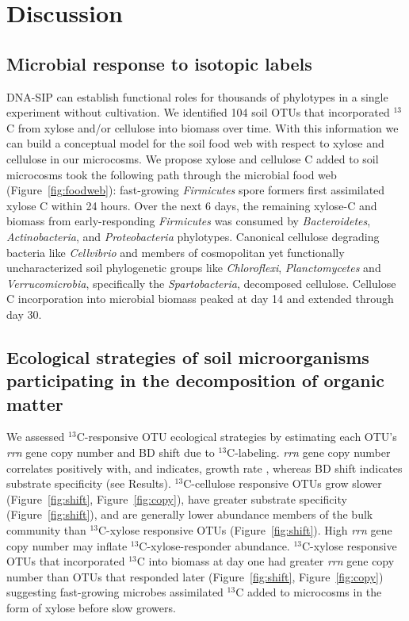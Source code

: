 \section{Discussion} 
\subsection{Microbial response to isotopic labels}
DNA-SIP can establish functional roles for thousands of phylotypes in a single
experiment without cultivation. We identified 104 soil OTUs that incorporated
$^{13}$C from xylose and/or cellulose into biomass over time. With this
information we can build a conceptual model for the soil food web with respect
to xylose and cellulose in our microcosms. We propose xylose and
cellulose C added to soil microcosms took the following path through the
microbial food web (Figure~\ref{fig:foodweb}): fast-growing \textit{Firmicutes}
spore formers first assimilated xylose C within 24 hours. Over the next
6 days, the remaining xylose-C and biomass from early-responding
\textit{Firmicutes} was consumed by \textit{Bacteroidetes},
\textit{Actinobacteria}, and \textit{Proteobacteria} phylotypes. Canonical
cellulose degrading bacteria like \textit{Cellvibrio} and members of
cosmopolitan yet functionally uncharacterized soil phylogenetic groups like
\textit{Chloroflexi}, \textit{Planctomycetes} and \textit{Verrucomicrobia},
specifically the \textit{Spartobacteria}, decomposed cellulose. Cellulose
C incorporation into microbial biomass peaked at day 14 and extended through
day 30.

\subsection{Ecological strategies of soil microorganisms participating in the
decomposition of organic matter}
We assessed $^{13}$C-responsive OTU ecological strategies by estimating each
OTU's \textit{rrn} gene copy number and BD shift due to $^{13}$C-labeling.
\textit{rrn} gene copy number correlates positively with, and indicates, growth
rate \citep{11125085,Kembel_2012}, whereas BD shift indicates substrate
specificity (see Results). $^{13}$C-cellulose responsive OTUs grow slower
(Figure~\ref{fig:shift}, Figure~\ref{fig:copy}), have greater substrate
specificity (Figure~\ref{fig:shift}), and are generally lower abundance members
of the bulk community than $^{13}$C-xylose responsive OTUs
(Figure~\ref{fig:shift}). High \textit{rrn} gene copy number may inflate
$^{13}$C-xylose-responder abundance. $^{13}$C-xylose responsive OTUs that
incorporated $^{13}$C into biomass at day one had greater \textit{rrn} gene
copy number than OTUs that responded later (Figure~\ref{fig:shift},
Figure~\ref{fig:copy}) suggesting fast-growing microbes assimilated $^{13}$C
added to microcosms in the form of xylose before slow growers.

